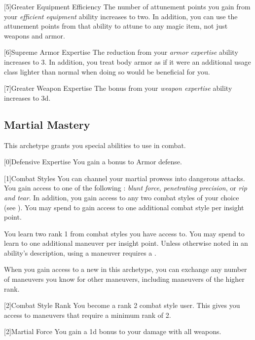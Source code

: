         [5]{Greater Equipment Efficiency} The number of attunement points you gain from your \textit{efficient equipment} ability increases to two.
        In addition, you can use the attunement points from that ability to attune to any magic item, not just weapons and armor.

        [6]{Supreme Armor Expertise}
        The  reduction from your \textit{armor expertise} ability increases to 3.
        In addition, you treat body armor as if it were an additional usage class lighter than normal when doing so would be beneficial for you.

        [7]{Greater Weapon Expertise} The bonus from your \textit{weapon expertise} ability increases to \plus3d.

    \newpage
    \subsection{Martial Mastery}
        This archetype grants you special abilities to use in combat.

        [0]{Defensive Expertise} You gain a  bonus to Armor defense.

        {
            [1]{Combat Styles}
            You can channel your martial prowess into dangerous attacks.
            You gain access to one of the following : \textit{blunt force}, \textit{penetrating precision}, or \textit{rip and tear}.
            In addition, you gain access to any two combat styles of your choice (see ).
            You may spend  to gain access to one additional combat style per insight point.

            You learn two rank 1  from combat styles you have access to.
            You may spend  to learn to one additional maneuver per insight point.
            Unless otherwise noted in an ability's description, using a maneuver requires a .

            When you gain access to a new  in this archetype,
                you can exchange any number of maneuvers you know for other maneuvers,
                including maneuvers of the higher rank.
        }

        {
            [2]{Combat Style Rank} You become a rank 2 combat style user.
            This gives you access to maneuvers that require a minimum rank of 2.

            [2]{Martial Force} You gain a \plus1d bonus to your damage with all weapons.
        }

